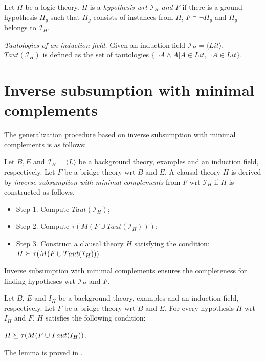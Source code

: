 \begin{defn}\label{definition_hypothesis_wrt_induction_field_bridge_theory}
Let $H$ be a logic theory. $H$ is a \emph{hypothesis wrt $\mathcal{I}_H$ and $F$} if there is a ground hypothesis $H_g$ such that $H_g$ consists of instances from $H$,
$F \models \neg H_g$ and $H_g$ belongs to $\mathcal{I}_H$.
\end{defn}

\begin{defn}\emph{Tautologies of an induction field.}
Given an induction field $\mathcal{I}_H = \langle Lit \rangle$, $Taut(\mathcal{I}_H)$ is defined
as the set of tautologies $\{\neg A \land A | A \in Lit, \neg A \in Lit\}$.
\end{defn}

\section{Inverse subsumption with minimal complements}\label{sec:inverse_subsumption_with_minimal_complements}
The generalization procedure based on inverse subsumption with minimal complements is as follows:

\begin{defn}\label{inverse_subsumption_with_minimal_complements_algorithm}
Let $B, E$ and $\mathcal{I}_H = \langle L \rangle$ be a background theory, examples and an induction
field, respectively. Let $F$ be a bridge theory wrt $B$ and $E$. A clausal theory $H$ is derived
by \emph{inverse subsumption with minimal complements} from $F$ wrt $\mathcal{I}_H$ if $H$ is constructed as follows.
\begin{itemize}
\item Step 1. Compute $Taut(\mathcal{I}_H)$;
\item Step 2. Compute $\tau(M(F \cup Taut(\mathcal{I}_H)))$;
\item Step 3. Construct a clausal theory $H$ satisfying the condition:
$H \succeq \tau(M(F \cup Taut(\mathcal{I}_H)))$.
\end{itemize}
\end{defn}

Inverse subsumption with minimal complements ensures the completeness for finding
hypotheses wrt $\mathcal{I}_H$ and $F$.

\begin{lemma}\label{yamamoto2012inverseLemma2}\cite{yamamoto2012inverse}
Let $B$, $E$ and $I_H$ be a background theory, examples and an induction field,
respectively. Let $F$ be a bridge theory wrt $B$ and $E$. For every hypothesis $H$ wrt $I_H$ and $F$, $H$ satisfies the following condition:

$H \succeq \tau(M(F \cup Taut(I_H))$.
\end{lemma}
The lemma is proved in \cite{yamamoto2012inverse}.

